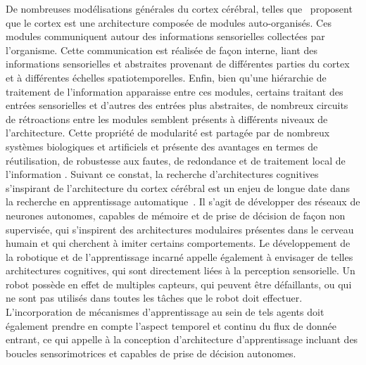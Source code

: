 De nombreuses modélisations générales du cortex cérébral, telles que~\cite{binzegger05, Meunier2009HierarchicalMI,sporns_structure_2013,betzel_multi-scale_2017} proposent que le cortex est une architecture composée de modules auto-organisés. Ces modules communiquent autour des informations sensorielles collectées par l'organisme. Cette communication est réalisée de façon interne, liant des informations sensorielles et abstraites provenant de différentes parties du cortex et à différentes échelles spatiotemporelles. Enfin, bien qu'une hiérarchie de traitement de l'information apparaisse entre ces modules, certains traitant des entrées sensorielles et d'autres des entrées plus abstraites, de nombreux circuits de rétroactions entre les modules semblent présents à différents niveaux de l'architecture. 
Cette propriété de modularité est partagée par de nombreux systèmes biologiques et artificiels et présente des avantages en termes de réutilisation, de robustesse aux fautes, de redondance et de traitement local de l'information \parencite{clune_evolutionary_2013}.
Suivant ce constat, la recherche d'architectures cognitives s'inspirant de l'architecture du cortex cérébral est un enjeu de longue date dans la recherche en apprentissage automatique~\parencite{Kotseruba201840YO}. Il s'agit de développer des réseaux de neurones autonomes, capables de mémoire et de prise de décision de façon non supervisée, qui s'inspirent des architectures modulaires présentes dans le cerveau humain et qui cherchent à imiter certains comportements.
Le développement de la robotique et de l'apprentissage incarné appelle également à envisager de telles architectures cognitives, qui sont directement liées à la perception sensorielle.
Un robot possède en effet de multiples capteurs, qui peuvent être défaillants, ou qui ne sont pas utilisés dans toutes les tâches que le robot doit effectuer. L'incorporation de mécanismes d'apprentissage au sein de tels agents doit également prendre en compte l'aspect temporel et continu du flux de donnée entrant, ce qui appelle à la conception d'architecture d'apprentissage incluant des boucles sensorimotrices et capables de prise de décision autonomes.

